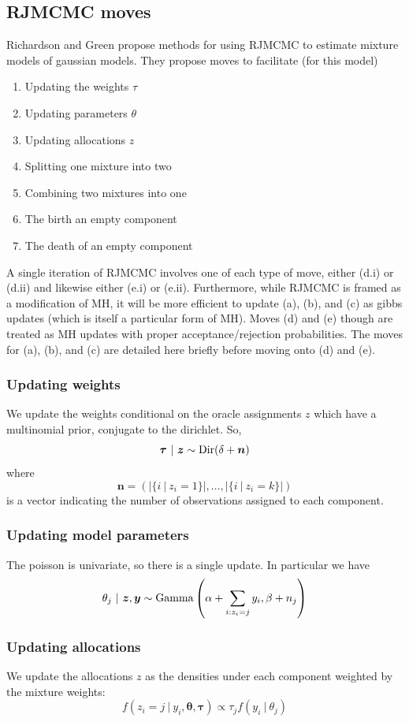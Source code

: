 \documentclass[12pt, reqno]{amsart}
\begin{document}
\subsection{RJMCMC moves}
Richardson and Green \cite{richardson_bayesian_1997} propose methods for using RJMCMC to estimate mixture models of gaussian models. They propose moves to facilitate (for this model)
\begin{enumerate}
\item[(a)] Updating the weights $\tau$
\item[(b)] Updating parameters $\theta$
\item[(c)] Updating allocations $z$
\item[(d.i)] Splitting one mixture into two
\item[(d.ii)] Combining two mixtures into one
\item[(e.i)] The birth an empty component
\item[(e.ii)] The death of an empty component
\end{enumerate}
A single iteration of RJMCMC involves one of each type of move, either (d.i) or (d.ii) and likewise either (e.i) or (e.ii). Furthermore, while RJMCMC is framed as a modification of MH, it will be more efficient to update (a), (b), and (c) as gibbs updates (which is itself a particular form of MH). Moves (d) and (e) though are treated as MH updates with proper acceptance/rejection probabilities. The moves for (a), (b), and (c) are detailed here briefly before moving onto (d) and (e).

\subsubsection{Updating weights}
We update the weights conditional on the oracle assignments $z$ which have a multinomial prior, conjugate to the dirichlet. So, 
\[ \bm\tau ~|~ \bm{z} \sim \mathrm{Dir}(\delta + \bm{n}) \]
where 
\[\bm{n} = \left(|\{i ~|~ z_i = 1\}|, \dots, |\{i ~|~ z_i = k\}|\right) \]
is a vector indicating the number of observations assigned to each component.

\subsubsection{Updating model parameters}
The poisson is univariate, so there is a single update. In particular we have
\[ \theta_j ~|~ \bm{z}, \bm{y} \sim \mathrm{Gamma}\left( \alpha + \sum_{i:z_i = j} y_i, \beta + n_j\right) \]

\subsubsection{Updating allocations}
We update the allocations $z$ as the densities under each component weighted by the mixture weights:
\[f(z_i = j~|~ y_i, \bm\theta, \bm\tau) \propto \tau_j f(y_i ~|~ \theta_j) \] %
\end{document}
